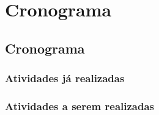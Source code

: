 \part{Cronograma}

\chapter[Cronograma]{Cronograma}

\section{Atividades já realizadas}
\section{Atividades a serem realizadas}
